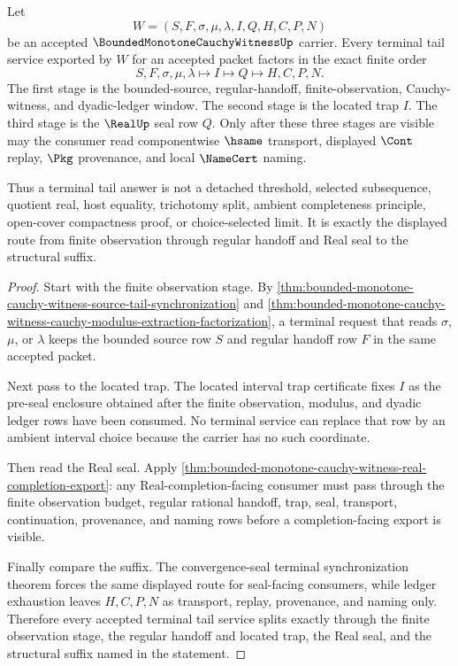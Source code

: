 \begin{theorem}
\label{thm:bounded-monotone-cauchy-witness-terminal-window-split-exactness}
Let
$$
W=(S,F,\sigma,\mu,\lambda,I,Q,H,C,P,N)
$$
be an accepted $\BoundedMonotoneCauchyWitnessUp$ carrier. Every terminal tail service exported by $W$ for an accepted packet factors in the exact finite order
$$
S,F,\sigma,\mu,\lambda \longmapsto I \longmapsto Q \longmapsto H,C,P,N.
$$
The first stage is the bounded-source, regular-handoff, finite-observation, Cauchy-witness, and dyadic-ledger window. The second stage is the located trap $I$. The third stage is the $\RealUp$ seal row $Q$. Only after these three stages are visible may the consumer read componentwise $\hsame$ transport, displayed $\Cont$ replay, $\Pkg$ provenance, and local $\NameCert$ naming.

Thus a terminal tail answer is not a detached threshold, selected subsequence, quotient real, host equality, trichotomy split, ambient completeness principle, open-cover compactness proof, or choice-selected limit. It is exactly the displayed route from finite observation through regular handoff and Real seal to the structural suffix.
\end{theorem}
\begin{proof}
Start with the finite observation stage. By \autoref{thm:bounded-monotone-cauchy-witness-source-tail-synchronization} and \autoref{thm:bounded-monotone-cauchy-witness-cauchy-modulus-extraction-factorization}, a terminal request that reads $\sigma$, $\mu$, or $\lambda$ keeps the bounded source row $S$ and regular handoff row $F$ in the same accepted packet.

Next pass to the located trap. The located interval trap certificate fixes $I$ as the pre-seal enclosure obtained after the finite observation, modulus, and dyadic ledger rows have been consumed. No terminal service can replace that row by an ambient interval choice because the carrier has no such coordinate.

Then read the Real seal. Apply \autoref{thm:bounded-monotone-cauchy-witness-real-completion-export}: any Real-completion-facing consumer must pass through the finite observation budget, regular rational handoff, trap, seal, transport, continuation, provenance, and naming rows before a completion-facing export is visible.

Finally compare the suffix. The convergence-seal terminal synchronization theorem forces the same displayed route for seal-facing consumers, while ledger exhaustion leaves $H,C,P,N$ as transport, replay, provenance, and naming only. Therefore every accepted terminal tail service splits exactly through the finite observation stage, the regular handoff and located trap, the Real seal, and the structural suffix named in the statement.
\end{proof}
